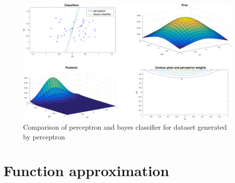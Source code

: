 \documentclass[11pt, a4paper]{article}
\begin{document}
\begin{figure}[H]
    \centering
    \includegraphics[scale=.40]{perceptron_bayes.pdf}
    \caption{Comparison of perceptron and bayes classifier for dataset
      generated by perceptron}
    \label{fig:perceptron_bayes}
\end{figure}


\section{Function approximation}

 

\end{document}
